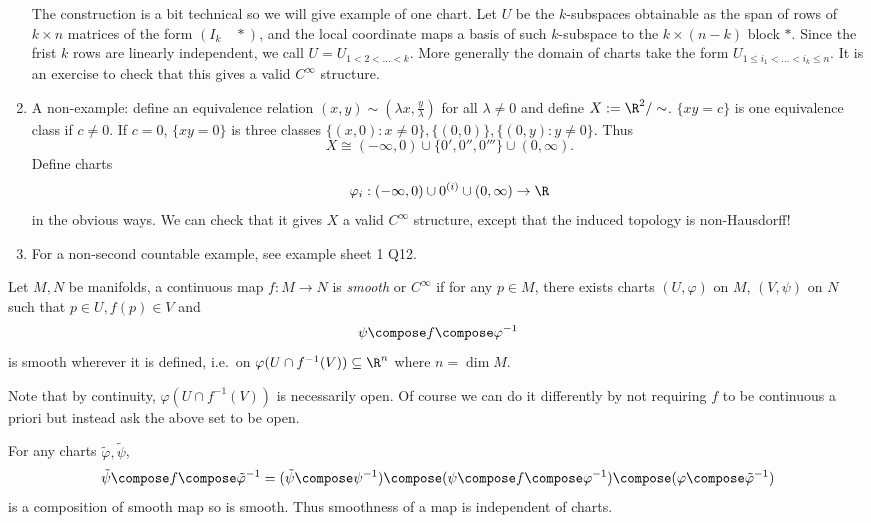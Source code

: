 \documentclass[a4paper]{article}
\begin{document}
\begin{eg}
\begin{enumerate}
    The construction is a bit technical so we will give example of one chart. Let \(U\) be the \(k\)-subspaces obtainable as the span of rows of \(k \times n\) matrices of the form \((I_k \quad *)\), and the local coordinate maps a basis of such \(k\)-subspace to the \(k \times (n - k)\) block \(*\). Since the frist \(k\) rows are linearly independent, we call \(U = U_{1 < 2 < \dots < k}\). More generally the domain of charts take the form \(U_{1 \leq i_1 < \dots < i_k \leq n}\). It is an exercise to check that this gives a valid \(C^\infty\) structure.
  \item A non-example: define an equivalence relation \((x, y) \sim (\lambda x, \frac{y}{\lambda})\) for all \(\lambda \neq 0\) and define \(X := \R^2/\sim\). \(\{xy = c\}\) is one equivalence class if \(c \neq 0\). If \(c = 0\), \(\{xy = 0\}\) is three classes \(\{(x, 0): x \neq 0\}, \{(0, 0)\}, \{(0, y): y \neq 0\}\). Thus
    \[
      X \cong (-\infty, 0) \cup \{0', 0'', 0'''\} \cup (0, \infty).
    \]
    Define charts
    \[
      \varphi_i: (-\infty, 0) \cup 0^{(i)} \cup (0, \infty) \to \R
    \]
    in the obvious ways. We can check that it gives \(X\) a valid \(C^\infty\) structure, except that the induced topology is non-Hausdorff!
  \item For a non-second countable example, see example sheet 1 Q12.
  \end{enumerate}
\end{eg}

\begin{definition}
  Let \(M, N\) be manifolds, a continuous map \(f: M \to N\) is \emph{smooth} or \(C^\infty\) if for any \(p \in M\), there exists charts \((U, \varphi)\) on \(M\), \((V, \psi)\) on \(N\) such that \(p \in U, f(p) \in V\) and
  \[
    \psi \compose f \compose \varphi^{-1}
  \]
  is smooth wherever it is defined, i.e.\ on \(\varphi(U \cap f^{-1}(V)) \subseteq \R^n\) where \(n = \dim M\).
\end{definition}

\begin{remark}
  Note that by continuity, \(\varphi(U \cap f^{-1}(V))\) is necessarily open. Of course we can do it differently by not requiring \(f\) to be continuous a priori but instead ask the above set to be open.
\end{remark}

For any charts \(\tilde \varphi, \tilde \psi\),
\[
  \tilde \psi \compose f \compose \tilde \varphi^{-1} = (\tilde \psi \compose \psi^{-1}) \compose (\psi \compose f \compose \varphi^{-1}) \compose (\varphi \compose \tilde \varphi^{-1})
\]
is a composition of smooth map so is smooth. Thus smoothness of a map is independent of charts.
\end{document}
